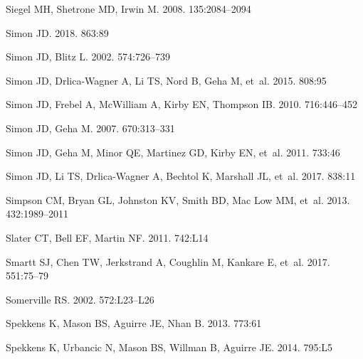 \documentclass[a4paper]{ar-1col}
\begin{document}
\begin{thebibliography}{}
{Siegel} MH, {Shetrone} MD, {Irwin} M. 2008.
\textit{\aj} 135:2084--2094

{Simon} JD. 2018.
\textit{\apj} 863:89

{Simon} JD, {Blitz} L. 2002.
\textit{\apj} 574:726--739

{Simon} JD, {Drlica-Wagner} A, {Li} TS, {Nord} B, {Geha} M, et~al. 2015.
\textit{\apj} 808:95

{Simon} JD, {Frebel} A, {McWilliam} A, {Kirby} EN, {Thompson} IB. 2010.
\textit{\apj} 716:446--452

{Simon} JD, {Geha} M. 2007.
\textit{\apj} 670:313--331

{Simon} JD, {Geha} M, {Minor} QE, {Martinez} GD, {Kirby} EN, et~al. 2011.
\textit{\apj} 733:46

{Simon} JD, {Li} TS, {Drlica-Wagner} A, {Bechtol} K, {Marshall} JL, et~al.
  2017.
\textit{\apj} 838:11

{Simpson} CM, {Bryan} GL, {Johnston} KV, {Smith} BD, {Mac Low} MM, et~al. 2013.
\textit{\mnras} 432:1989--2011

{Slater} CT, {Bell} EF, {Martin} NF. 2011.
\textit{\apjl} 742:L14

{Smartt} SJ, {Chen} TW, {Jerkstrand} A, {Coughlin} M, {Kankare} E, et~al. 2017.
\textit{\nat} 551:75--79

{Somerville} RS. 2002.
\textit{\apjl} 572:L23--L26

{Spekkens} K, {Mason} BS, {Aguirre} JE, {Nhan} B. 2013.
\textit{\apj} 773:61

{Spekkens} K, {Urbancic} N, {Mason} BS, {Willman} B, {Aguirre} JE. 2014.
\textit{\apjl} 795:L5


\end{thebibliography}
\end{document}
